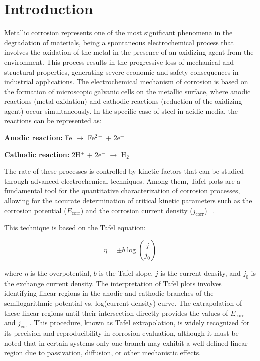 \section{Introduction}
Metallic corrosion represents one of the most significant phenomena in the degradation of materials, being a spontaneous electrochemical process that involves the oxidation of the metal in the presence of an oxidizing agent from the environment. This process results in the progressive loss of mechanical and structural properties, generating severe economic and safety consequences in industrial applications. The electrochemical mechanism of corrosion is based on the formation of microscopic galvanic cells on the metallic surface, where anodic reactions (metal oxidation) and cathodic reactions (reduction of the oxidizing agent) occur simultaneously. In the specific case of steel in acidic media, the reactions can be represented as:

\textbf{Anodic reaction:} Fe $\rightarrow$ Fe$^{2+}$ + 2e$^{-}$

\textbf{Cathodic reaction:} 2H$^{+}$ + 2e$^{-}$ $\rightarrow$ H$_2$

The rate of these processes is controlled by kinetic factors that can be studied through advanced electrochemical techniques. Among them, Tafel plots are a fundamental tool for the quantitative characterization of corrosion processes, allowing for the accurate determination of critical kinetic parameters such as the corrosion potential ($E_{\mathrm{corr}}$) and the corrosion current density ($j_{\mathrm{corr}}$)~ \cite{stern1957}.

This technique is based on the Tafel equation:



\[
\eta = \pm b \log \left(\frac{j}{j_0}\right)
\]



where $\eta$ is the overpotential, $b$ is the Tafel slope, $j$ is the current density, and $j_0$ is the exchange current density. The interpretation of Tafel plots involves identifying linear regions in the anodic and cathodic branches of the semilogarithmic potential vs. log(current density) curve. The extrapolation of these linear regions until their intersection directly provides the values of $E_{\text{corr}}$ and $j_{\text{corr}}$. This procedure, known as Tafel extrapolation, is widely recognized for its precision and reproducibility in corrosion evaluation, although it must be noted that in certain systems only one branch may exhibit a well-defined linear region due to passivation, diffusion, or other mechanistic effects.

